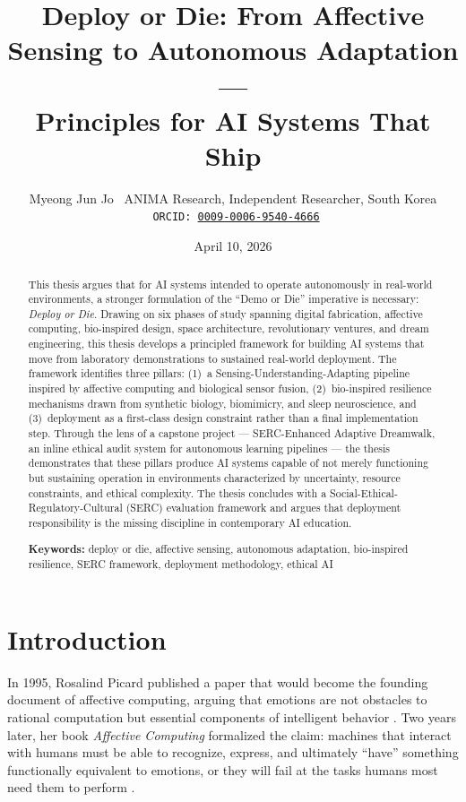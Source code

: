 \documentclass[11pt,a4paper]{article}
\title{%
  \textbf{Deploy or Die: From Affective Sensing to Autonomous Adaptation ---\\
  Principles for AI Systems That Ship}
}
\author{%
  Myeong Jun Jo \
  ANIMA Research, Independent Researcher, South Korea \
  \texttt{ORCID: \href{https://orcid.org/0009-0006-9540-4666}{0009-0006-9540-4666}}
}
\date{April 10, 2026}
\begin{document}
\maketitle

\begin{abstract}
This thesis argues that for AI systems intended to operate autonomously in real-world environments, a stronger formulation of the ``Demo or Die'' imperative is necessary: \emph{Deploy or Die}. Drawing on six phases of study spanning digital fabrication, affective computing, bio-inspired design, space architecture, revolutionary ventures, and dream engineering, this thesis develops a principled framework for building AI systems that move from laboratory demonstrations to sustained real-world deployment. The framework identifies three pillars: (1)~a Sensing-Understanding-Adapting pipeline inspired by affective computing and biological sensor fusion, (2)~bio-inspired resilience mechanisms drawn from synthetic biology, biomimicry, and sleep neuroscience, and (3)~deployment as a first-class design constraint rather than a final implementation step. Through the lens of a capstone project --- SERC-Enhanced Adaptive Dreamwalk, an inline ethical audit system for autonomous learning pipelines --- the thesis demonstrates that these pillars produce AI systems capable of not merely functioning but sustaining operation in environments characterized by uncertainty, resource constraints, and ethical complexity. The thesis concludes with a Social-Ethical-Regulatory-Cultural (SERC) evaluation framework and argues that deployment responsibility is the missing discipline in contemporary AI education.

\vspace{6pt}
\noindent\textbf{Keywords:} deploy or die, affective sensing, autonomous adaptation, bio-inspired resilience, SERC framework, deployment methodology, ethical AI
\end{abstract}

\section{Introduction}

In 1995, Rosalind Picard published a paper that would become the founding document of affective computing, arguing that emotions are not obstacles to rational computation but essential components of intelligent behavior \citep{picard1995}. Two years later, her book \emph{Affective Computing} formalized the claim: machines that interact with humans must be able to recognize, express, and ultimately ``have'' something functionally equivalent to emotions, or they will fail at the tasks humans most need them to perform \citep{picard1997}.
\end{document}
